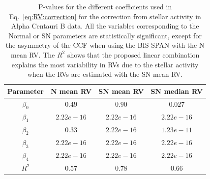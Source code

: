 \documentclass{aa}
\begin{document}
\begin{table}
\begin{center}
\caption{P-values for the different coefficients used in Eq.~\eqref{eq:RV:correction} for the correction from stellar activity in Alpha Centauri B data. All the variables corresponding to the Normal or SN parameters are statistically significant, except for the asymmetry of the CCF when using the BIS SPAN with the N mean RV.
The $R^2$ shows that the proposed linear combination explains the most variability in RVs due to the stellar activity when the RVs are estimated with the SN mean RV.}
\label{table:alphacent.test}
\begin{tabular}{|c|c|c|c|}
\hline
Parameter          & N mean RV         &   SN mean RV &   SN median RV \\
\hline
$\beta_{0}$            &    $0.49$    & $0.90 $  & $0.027$ \\
\hline
$\beta_{1}$            &    $2.22e-16$    & $2.22e-16 $  & $2.22e-16$ \\
\hline
$\beta_{2}$            &     $0.33$   & $2.22e-16 $ & $1.23e-11$\\
\hline
$\beta_{3}$            &     $ 2.22e-16$   &  $2.22e-16 $  & $ 2.22e-16$\\
\hline
$\beta_{4}$            &     $2.22e-16$   &  $2.22e-16 $ & $ 2.22e-16 $\\
\hline
$R^{2}$      &     $0.57$    &  $0.78$ & $0.66$  \\
\hline
\end{tabular}
\end{center}
\end{table}

\end{document}
